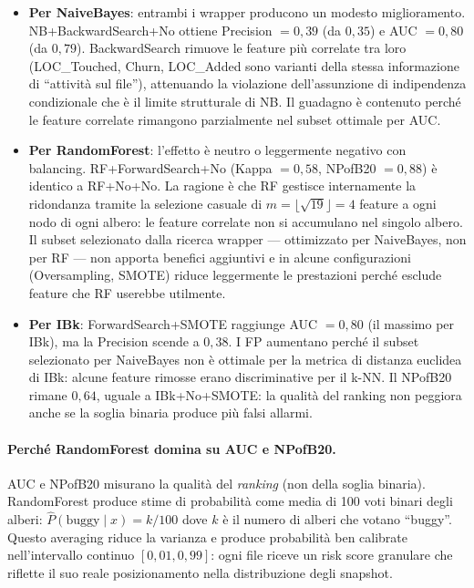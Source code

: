 \begin{itemize}
\item \textbf{Per NaiveBayes}: entrambi i wrapper producono un modesto miglioramento.
      NB+BackwardSearch+No ottiene Precision $= 0{,}39$ (da $0{,}35$) e AUC $= 0{,}80$
      (da $0{,}79$). BackwardSearch rimuove le feature più correlate tra loro
      (LOC\_Touched, Churn, LOC\_Added sono varianti della stessa informazione di
      ``attività sul file''), attenuando la violazione dell'assunzione di indipendenza
      condizionale che è il limite strutturale di NB. Il guadagno è contenuto perché
      le feature correlate rimangono parzialmente nel subset ottimale per AUC.

\item \textbf{Per RandomForest}: l'effetto è neutro o leggermente negativo con balancing.
      RF+ForwardSearch+No (Kappa $= 0{,}58$, NPofB20 $= 0{,}88$) è identico a
      RF+No+No. La ragione è che RF gestisce internamente la ridondanza tramite la
      selezione casuale di $m = \lfloor\sqrt{19}\rfloor = 4$ feature a ogni nodo di
      ogni albero: le feature correlate non si accumulano nel singolo albero. Il subset
      selezionato dalla ricerca wrapper --- ottimizzato per NaiveBayes, non per RF ---
      non apporta benefici aggiuntivi e in alcune configurazioni (Oversampling, SMOTE)
      riduce leggermente le prestazioni perché esclude feature che RF userebbe utilmente.

\item \textbf{Per IBk}: ForwardSearch+SMOTE raggiunge AUC $= 0{,}80$ (il massimo per
      IBk), ma la Precision scende a $0{,}38$. I FP aumentano perché il subset
      selezionato per NaiveBayes non è ottimale per la metrica di distanza euclidea di
      IBk: alcune feature rimosse erano discriminative per il k-NN. Il NPofB20 rimane
      $0{,}64$, uguale a IBk+No+SMOTE: la qualità del ranking non peggiora anche se la
      soglia binaria produce più falsi allarmi.
\end{itemize}

\paragraph{Perché RandomForest domina su AUC e NPofB20.}

AUC e NPofB20 misurano la qualità del \emph{ranking} (non della soglia binaria).
RandomForest produce stime di probabilità come media di 100 voti binari degli alberi:
$\hat{P}(\text{buggy} \mid x) = k/100$ dove $k$ è il numero di alberi che votano
``buggy''. Questo averaging riduce la varianza e produce probabilità ben calibrate
nell'intervallo continuo $[0{,}01, 0{,}99]$: ogni file riceve un risk score granulare
che riflette il suo reale posizionamento nella distribuzione degli snapshot.

